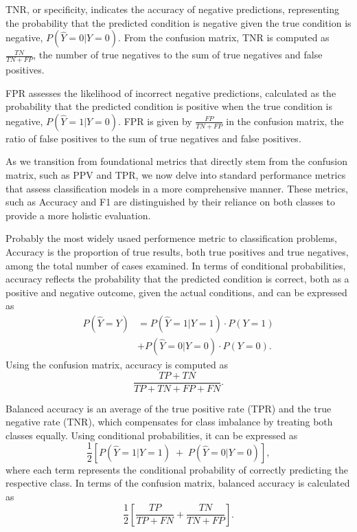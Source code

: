 \begin{definition}\label{def:tnr}
TNR, or specificity, indicates the accuracy of negative predictions, representing the probability that the predicted condition is negative given the true condition is negative, $P(\hat{Y}=0|Y=0)$. From the confusion matrix, TNR is computed as $\frac{TN}{TN + FP}$, the number of true negatives to the sum of true negatives and false positives.
\end{definition}

\begin{definition}\label{def:fpr}
FPR assesses the likelihood of incorrect negative predictions, calculated as the probability that the predicted condition is positive when the true condition is negative, $P(\hat{Y}=1|Y=0)$. FPR is given by $\frac{FP}{TN + FP}$ in the confusion matrix, the ratio of false positives to the sum of true negatives and false positives.
\end{definition}

As we transition from foundational metrics that directly stem from the confusion matrix, such as PPV and TPR, we now delve into standard performance metrics that assess classification models in a more comprehensive manner. These metrics, such as Accuracy and F1 are distinguished by their reliance on both classes to provide a more holistic evaluation.

\begin{definition}\label{def:acc}
Probably the most widely usaed performence metric to classification problems, Accuracy is the proportion of true results, both true positives and true negatives, among the total number of cases examined. In terms of conditional probabilities, accuracy reflects the probability that the predicted condition is correct, both as a positive and negative outcome, given the actual conditions, and can be 
expressed as 
\begin{align*}
    P(\hat{Y}=Y) &= P(\hat{Y}=1|Y=1) \cdot P(Y=1) \\
    &+ P(\hat{Y}=0|Y=0) \cdot P(Y=0).
\end{align*}
Using the confusion matrix, accuracy is computed as $$\frac{TP + TN}{TP + TN + FP + FN}.$$
\end{definition}
    
\begin{definition}\label{def:ba}
Balanced accuracy is an average of the true positive rate (TPR) and the true negative rate (TNR), which compensates for class imbalance by treating both classes equally. Using conditional probabilities, it can be expressed as $$\frac{1}{2}\left[ P(\hat{Y}=1|Y=1) \; + \; P(\hat{Y}=0|Y=0)\right],$$ where each term represents the conditional probability of correctly predicting the respective class. In terms of the confusion matrix, balanced accuracy is calculated as $$\frac{1}{2}\left[\frac{TP}{TP + FN} + \frac{TN}{TN + FP}\right].$$
\end{definition}
    

